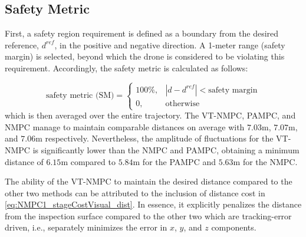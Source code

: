 






\subsection{Safety Metric}

First, a safety region requirement is defined as a boundary from the desired reference, $d^{ref}$, in the positive and negative direction. A 1-meter range (safety margin) is selected, beyond which the drone is considered to be violating this requirement. Accordingly, the safety metric is calculated as follows:

\begin{equation}
    \text{safety metric (SM)} = 
    \begin{cases}
      100\%, &   |d - d^{ref}| < \text{safety margin}\\
      0, & \text{otherwise}
    \end{cases}
    \label{eq:safety}
\end{equation}
which is then averaged over the entire trajectory. 
 The VT-NMPC, PAMPC, and NMPC manage to maintain comparable distances on average with $7.03$m, $7.07$m, and $7.06$m respectively. Nevertheless, the amplitude of fluctuations for the VT-NMPC is significantly lower than the NMPC and PAMPC, obtaining a minimum distance of $6.15$m compared to $5.84$m for the PAMPC and $5.63$m for the NMPC.

 The ability of the VT-NMPC to maintain the desired distance compared to the other two methods can be attributed to the inclusion of distance cost in \eqref{eq:NMPC1_stageCostVisual_dist}.  In essence, it explicitly penalizes the distance from the inspection surface compared to the other two which are tracking-error driven, i.e., separately minimizes the error in $x$, $y$, and $z$ components.




